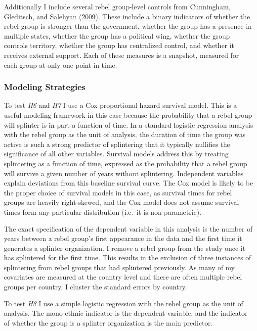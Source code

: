 \documentclass[12pt,]{book}
\theoremstyle{definition}
\theoremstyle{definition}
\theoremstyle{remark}
\begin{document}
Additionally I include several rebel group-level controls from
Cunningham, Gleditsch, and Salehyan
(\protect\hyperlink{ref-Cunningham2009}{2009}). These include a binary
indicators of whether the rebel group is stronger than the government,
whether the group has a presence in multiple states, whether the group
has a political wing, whether the group controls territory, whether the
group has centralized control, and whether it receives external support.
Each of these measures is a snapshot, measured for each group at only
one point in time.

\subsubsection*{Modeling Strategies}\label{modeling-strategies}

To test \emph{H6} and \emph{H7} I use a Cox proportional hazard survival
model. This is a useful modeling framework in this case because the
probability that a rebel group will splinter is in part a function of
time. In a standard logistic regression analysis with the rebel group as
the unit of analysis, the duration of time the group was active is such
a strong predictor of splintering that it typically nullifies the
significance of all other variables. Survival models address this by
treating splintering as a function of time, expressed as the probability
that a rebel group will survive a given number of years without
splintering. Independent variables explain deviations from this baseline
survival curve. The Cox model is likely to be the proper choice of
survival models in this case, as survival times for rebel groups are
heavily right-skewed, and the Cox model does not assume survival times
form any particular distribution (i.e.~it is non-parametric).

The exact specification of the dependent variable in this analysis is
the number of years between a rebel group's first appearance in the data
and the first time it generates a splinter organization. I remove a
rebel group from the study once it has splintered for the first time.
This results in the exclusion of three instances of splintering from
rebel groups that had splintered previously. As many of my covariates
are measured at the country level and there are often multiple rebel
groups per country, I cluster the standard errors by country.

To test \emph{H8} I use a simple logistic regression with the rebel
group as the unit of analysis. The mono-ethnic indicator is the
dependent variable, and the indicator of whether the group is a splinter
organization is the main predictor.
\end{document}
